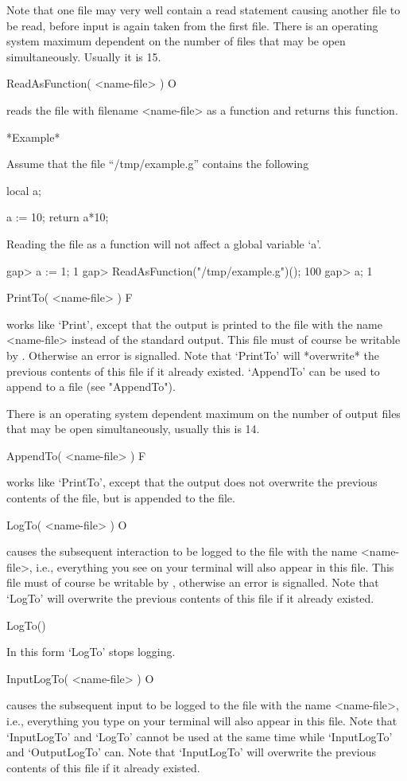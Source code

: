 Note that one file may very well contain a read statement causing another
file to be read, before input is again taken from the  first file.  There
is an operating system maximum dependent on the  number of files that may
be open simultaneously.  Usually it is 15.

\>ReadAsFunction( <name-file> ) O

reads the  file  with filename <name-file> as a function and returns this
function.

*Example*

Assume that the file ``/tmp/example.g'' contains the following

\begintt
local a;

a := 10;
return a*10;
\endtt

Reading the file as a function will not affect a global variable `a'.

\begintt
gap> a := 1;
1
gap> ReadAsFunction("/tmp/example.g")();
100
gap> a;
1
\endtt

\>PrintTo( <name-file> ) F

works like `Print',  except that the output  is printed to the  file with
the name <name-file>  instead of the standard output.   This file must of
course be writable by {\GAP}.  Otherwise an error is signalled. Note that
`PrintTo' will  *overwrite*  the  previous contents  of  this file  if it
already existed.  `AppendTo'  can   be used to   append to  a file   (see
"AppendTo").
    
There is an  operating system dependent maximum  on the number  of output
files that may be open simultaneously, usually this is 14.

\>AppendTo( <name-file> ) F

works like `PrintTo',  except  that the   output does  not overwrite  the
previous contents of the file, but is appended to the file.

\>LogTo( <name-file> ) O

causes the subsequent interaction to be logged  to the file with the name
<name-file>, i.e., everything you  see on your  terminal will also appear
in this file.
This file must of course be writable  by {\GAP}, otherwise an error is
signalled.  Note  that   `LogTo'  will overwrite the   previous
contents of this file if it already existed.

\)LogTo()

In this form `LogTo' stops logging.

\>InputLogTo( <name-file> ) O

causes the  subsequent  input to be   logged to the   file with  the name
<name-file>, i.e., everything you type  on your terminal will also appear
in this file.  Note that `InputLogTo'  and `LogTo' cannot  be used at the
same time while `InputLogTo' and `OutputLogTo' can.
Note  that   `InputLogTo'  will overwrite the   previous
contents of this file if it already existed.

